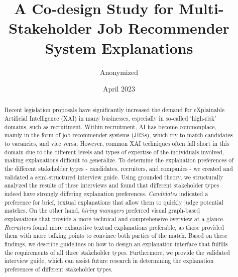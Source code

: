\documentclass[runningheads]{llncs}
\begin{document}
\title{A Co-design Study for Multi-Stakeholder Job Recommender System Explanations}


\author{Anonymized}


\date{April 2023}






\maketitle

\begin{abstract}
    Recent legislation proposals have significantly increased the demand for eXplainable Artificial Intelligence (XAI) in many businesses, especially in so-called `high-risk' domains, such as recruitment. Within recruitment, AI has become commonplace, mainly in the form of job recommender systems (JRSs), which try to match candidates to vacancies, and vice versa. However, common XAI techniques often fall short in this domain due to the different levels and types of expertise of the individuals involved, making explanations difficult to generalize. To determine the explanation preferences of the different stakeholder types - candidates, recruiters, and companies - we created and validated a semi-structured interview guide. Using grounded theory, we structurally analyzed the results of these interviews and found that different stakeholder types indeed have strongly differing explanation preferences. \textit{Candidates} indicated a preference for brief, textual explanations that allow them to quickly judge potential matches. On the other hand, \textit{hiring managers} preferred visual graph-based explanations that provide a more technical and comprehensive overview at a glance. \textit{Recruiters} found more exhaustive textual explanations preferable, as those provided them with more talking points to convince both parties of the match. Based on these findings, we describe guidelines on how to design an explanation interface that fulfills the requirements of all three stakeholder types. Furthermore, we provide the validated interview guide, which can assist future research in determining the explanation preferences of different stakeholder types. 
\end{abstract}









% 



\end{document}
